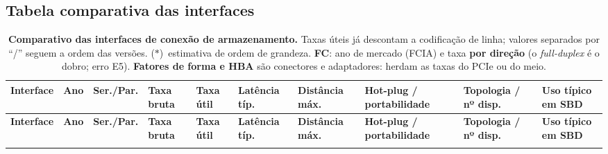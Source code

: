 \documentclass[11pt,a4paper]{article}
\renewcommand{\arraystretch}{1.15}
\begin{document}
\begin{landscape}
\thispagestyle{empty}
\subsection{Tabela comparativa das interfaces}
\vspace{-4pt}
{\scriptsize
\setlength{\tabcolsep}{3.2pt}
\renewcommand{\arraystretch}{1.0}
\begin{longtable}{@{}>{\RaggedRight\arraybackslash}p{3.1cm}>{\RaggedRight\arraybackslash}p{1.5cm}>{\RaggedRight\arraybackslash}p{1.7cm}>{\RaggedRight\arraybackslash}p{2.5cm}>{\RaggedRight\arraybackslash}p{2.9cm}>{\RaggedRight\arraybackslash}p{2.2cm}>{\RaggedRight\arraybackslash}p{2.3cm}>{\RaggedRight\arraybackslash}p{2.2cm}>{\RaggedRight\arraybackslash}p{2.9cm}>{\RaggedRight\arraybackslash}p{2.8cm}@{}}
\caption{\textbf{Comparativo das interfaces de conexão de armazenamento.} Taxas úteis já
descontam a codificação de linha; valores separados por ``/'' seguem a ordem das versões.
($\ast$)~estimativa de ordem de grandeza. \textbf{FC}: ano de mercado (FCIA) e taxa
\textbf{por direção} (o \emph{full-duplex} é o dobro; erro E5). \textbf{Fatores de forma e
HBA} são conectores e adaptadores: herdam as taxas do PCIe ou do meio.}\label{tab:if}\\
\toprule
\textbf{Interface} & \textbf{Ano} & \textbf{Ser./Par.} & \textbf{Taxa bruta} &
\textbf{Taxa útil} & \textbf{Latência típ.} & \textbf{Distância máx.} &
\textbf{Hot-plug / portabilidade} & \textbf{Topologia / nº disp.} & \textbf{Uso típico em SBD} \\
\midrule
\endfirsthead
\toprule
\textbf{Interface} & \textbf{Ano} & \textbf{Ser./Par.} & \textbf{Taxa bruta} &
\textbf{Taxa útil} & \textbf{Latência típ.} & \textbf{Distância máx.} &
\textbf{Hot-plug / portabilidade} & \textbf{Topologia / nº disp.} & \textbf{Uso típico em SBD} \\
\midrule
\endhead
\bottomrule
\endfoot


\end{longtable}}
\end{landscape}
\end{document}
